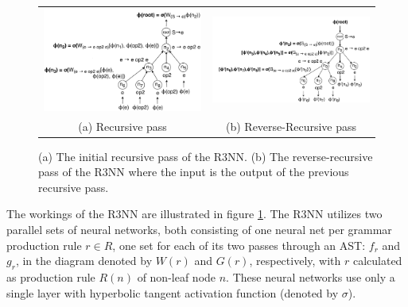 \documentclass{article}
\begin{document}
\begin{figure}[h]
    \begin{tabular}{cc}
        \begin{minipage}{0.45\linewidth}
            \includegraphics[scale=0.16]{figures/tree2.png}
        \end{minipage}
        &
        \begin{minipage}{0.55\linewidth}
            \includegraphics[scale=0.16]{figures/tree3.png}
        \end{minipage}
        \\
        (a) Recursive pass & (b) Reverse-Recursive pass
    \end{tabular}
    \caption{(a) The initial recursive pass of the R3NN. (b) The reverse-recursive pass of the R3NN where the input is the output of the previous recursive pass.}
    \label{r3nn}
\end{figure}

The workings of the R3NN are illustrated in figure \ref{r3nn}.
The R3NN utilizes two parallel sets of neural networks,
both consisting of one neural net per grammar production rule $r \in R$,
one set for each of its two passes through an AST: $f_r$ and $g_r$,
in the diagram denoted by $W(r)$ and $G(r)$, respectively,
with $r$ calculated as production rule $R(n)$ of non-leaf node $n$.
These neural networks use only a single layer with hyperbolic tangent activation function (denoted by $\sigma$).
\end{document}
